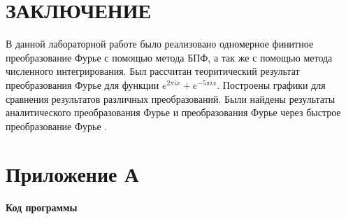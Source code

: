 \newpage
{}
{}


\section*{ЗАКЛЮЧЕНИЕ}
{
	В данной лабораторной работе было реализовано одномерное финитное преобразование Фурье с помощью метода БПФ, а так же с помощью метода численного интегрирования. Был рассчитан теоритический результат преобразования Фурье для функции $e^{2 \pi i x} + e^{- 5 \pi i x}$. Построены графики для сравнения результатов различных преобразований. Были найдены результаты аналитического преобразования Фурье и преобразования Фурье через быстрое преобразование Фурье .
}





\newpage
{}
{}
\section*{Приложение А}
{
	\begin{center}
	\textbf{Код программы}
	\end{center}
	
}

